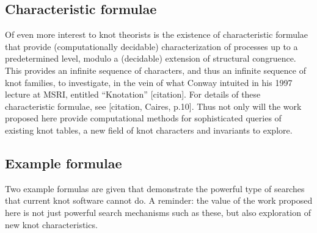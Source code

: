 \documentclass[12pt]{amsart}
\begin{document}

\subsection{Characteristic formulae}\label{sub:characteristic_formulae} %

Of even more interest to knot theorists is the existence of characteristic formulae that provide (computationally decidable) characterization of processes up to a predetermined level, modulo a (decidable) extension of structural congruence. This provides an infinite sequence of characters, and thus an infinite sequence of knot families, to investigate, in the vein of what Conway intuited in his 1997 lecture at MSRI, entitled “Knotation” [citation]. For details of these characteristic formulae, see [citation, Caires, p.10]. Thus not only will the work proposed here provide computational methods for sophisticated queries of existing knot tables, a new field of knot characters and invariants to explore.

\subsection{Example formulae}\label{sub:example_formulae_} %
                            
Two example formulas are given that demonstrate the powerful type of searches that current knot software cannot do. A reminder: the value of the work proposed here is not just powerful search mechanisms such as these, but also exploration of new knot characteristics. 




\end{document}
